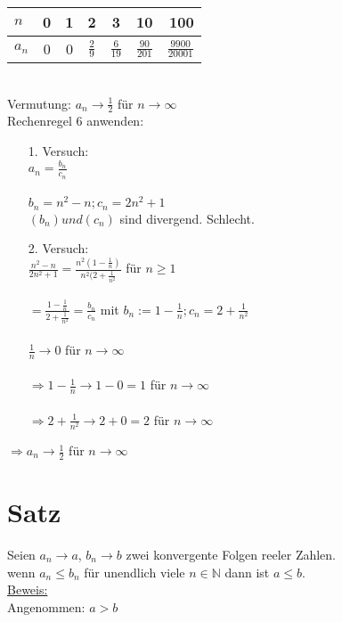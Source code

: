 \begin{tabular}{l|c|c|c|c|c|r}
$n$   & 0 & 1 & 2 & 3 & 10 & 100\\\hline
$a_n$ & 0 & 0 & $\frac{2}{9}$ & $\frac{6}{19}$ & $\frac{90}{201}$ & $\frac{9900}{20001}$ \\
\end{tabular}
\vspace{5mm}\\
Vermutung: $a_n \to \displaystyle\frac{1}{2}$ für $n \to \infty$\\
Rechenregel 6 anwenden:\\
\begin{itemize}
\item[1.]{Versuch:\\
$a_n = \frac{b_n}{c_n}$\\ 
\\
$b_n = n^2 -n; c_n = 2n^2 + 1$\\
$(b_n) und (c_n)$ sind divergend. Schlecht.}
\item[2.]{Versuch:\\
$\displaystyle\frac{n^2 - n}{2n^2 + 1} = \displaystyle\frac{n^2(1 - \displaystyle\frac{1}{n})}{n^2(2 + \displaystyle\frac{1}{n^2}}$ für $n \geq 1$ \\ \\
$= \displaystyle\frac{1 - \frac{1}{n}}{2 + \frac{1}{n^2}} = \displaystyle\frac{b_n}{c_n}$ mit $b_n := 1 - \displaystyle\frac{1}{n}; c_n = 2 + \displaystyle\frac{1}{n^2}$\\ \\
$\displaystyle\frac{1}{n} \to 0$ für $n \to \infty $
\\ \\ $\Rightarrow 1 - \displaystyle\frac{1}{n} \to 1 - 0 = 1$ für $n \to \infty$
\\ \\ $\Rightarrow 2 + \displaystyle\frac{1}{n^2} \to 2 + 0 = 2$ für $n \to \infty$}
\end{itemize}

$\Rightarrow a_n \to \frac{1}{2}$ für $n \to \infty$\\

\section{Satz}
Seien $a_n \to a$, $b_n \to b$ zwei konvergente Folgen reeler Zahlen.\\
wenn $a_n \leq b_n$ für unendlich viele $n \in \mathbb{N}$ dann ist $a \leq b$. \\
\underline{Beweis:}\\
Angenommen: $a > b$\\

